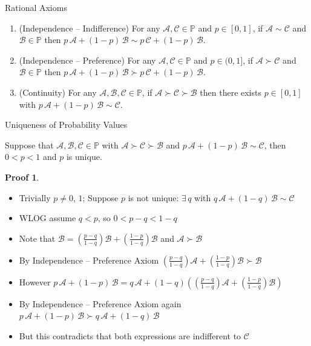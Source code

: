 \documentclass[10pt,handout]{beamer}
\newcommand{\ds}{\displaystyle}
\theoremstyle{definition}
\newtheorem*{prf}{Proof}
\begin{document}
\begin{frame}{Rational Axioms}
\begin{enumerate}[<+->]
  \item (Independence -- Indifference)
    For any $\mathcal{A}, \mathcal{C} \in \mathbb{P}$ and $p \in [0,1]$, if $\mathcal{A} \sim \mathcal{C}$ and $\mathcal{B} \in \mathbb{P}$ then $p\,\mathcal{A} + (1-p)\,\mathcal{B} \sim p\,\mathcal{C} + (1-p)\,\mathcal{B}$.

  \item (Independence -- Preference) 
    For any $\mathcal{A}, \mathcal{C} \in \mathbb{P}$ and $p \in (0,1]$, if $\mathcal{A} \succ \mathcal{C}$ and $\mathcal{B} \in \mathbb{P}$ then $p\,\mathcal{A} + (1-p)\,\mathcal{B} \succ p\,\mathcal{C} + (1-p)\,\mathcal{B}$.

  \item (Continuity) 
    For any $\mathcal{A}, \mathcal{B}, \mathcal{C} \in \mathbb{P}$, if $\mathcal{A} \succ \mathcal{C} \succ \mathcal{B}$ then there exists $p \in [0,1]$ with $p\,\mathcal{A} + (1-p)\,\mathcal{B} \sim \mathcal{C}$.
  \end{enumerate}
\end{frame}

\begin{frame}{Uniqueness of Probability Values}
  \begin{lemma}
    Suppose that $\mathcal{A}, \mathcal{B}, \mathcal{C} \in \mathbb{P}$ with $\mathcal{A} \succ \mathcal{C} \succ \mathcal{B}$ and $p\,\mathcal{A}+(1-p)\,\mathcal{B} \sim \mathcal{C}$, then $0 < p < 1$ and $p$ is unique.
  \end{lemma}
  
  \begin{prf}
    \begin{itemize}[<+->]
      \item Trivially $p \neq 0$, $1$; Suppose $p$ is not unique: $\exists\,q$ with $q\,\mathcal{A} + (1-q)\,\mathcal{B} \sim \mathcal{C}$
      \item WLOG assume $q < p$, so $0 < p-q < 1-q$
      \item Note that $\ds\mathcal{B} = \left(\frac{p-q}{1-q}\right)\mathcal{B} + \left(\frac{1-p}{1-q}\right)\mathcal{B}$ and $\mathcal{A} \succ \mathcal{B}$
      \item By Independence -- Preference Axiom $\ds\left(\frac{p-q}{1-q}\right)\mathcal{A} + \left(\frac{1-p}{1-q}\right)\mathcal{B} \succ \mathcal{B}$
      \item However $\ds p\,\mathcal{A} + (1-p)\,\mathcal{B} = q\,\mathcal{A} + (1-q)\left(\left(\frac{p-q}{1-q}\right)\mathcal{A} + \left(\frac{1-p}{1-q}\right)\mathcal{B}\right)$
      \item By Independence -- Preference Axiom again $\ds p\,\mathcal{A} + (1-p)\,\mathcal{B} \succ q\,\mathcal{A} + (1-q)\,\mathcal{B}$
      \item But this contradicts that both expressions are indifferent to $\mathcal{C}$
    \end{itemize}
  \end{prf}
\end{frame}
\end{document}
